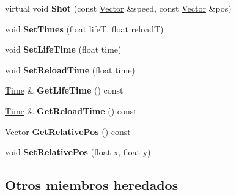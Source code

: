 \begin{DoxyCompactItemize}
\item 
\hypertarget{classGun_a06d33bb4fc2d7937b05dd76caa7f3636}{virtual void {\bfseries Shot} (const \hyperlink{classVector}{Vector} \&speed, const \hyperlink{classVector}{Vector} \&pos)}\label{classGun_a06d33bb4fc2d7937b05dd76caa7f3636}

\item 
\hypertarget{classGun_a5d821a89ad458d1edd25fbf62d3f05fd}{void {\bfseries Set\-Times} (float life\-T, float reload\-T)}\label{classGun_a5d821a89ad458d1edd25fbf62d3f05fd}

\item 
\hypertarget{classGun_a4d7569f0a79398fd13cebf02ed859c06}{void {\bfseries Set\-Life\-Time} (float time)}\label{classGun_a4d7569f0a79398fd13cebf02ed859c06}

\item 
\hypertarget{classGun_ab3d0e69a52be0f11a38198d8a1d88536}{void {\bfseries Set\-Reload\-Time} (float time)}\label{classGun_ab3d0e69a52be0f11a38198d8a1d88536}

\item 
\hypertarget{classGun_a03bd2ed00d1fdb1767b78b0bec26ef05}{\hyperlink{classTime}{Time} \& {\bfseries Get\-Life\-Time} () const }\label{classGun_a03bd2ed00d1fdb1767b78b0bec26ef05}

\item 
\hypertarget{classGun_ad95a0db1e8df971a1eacefbff01f1b2c}{\hyperlink{classTime}{Time} \& {\bfseries Get\-Reload\-Time} () const }\label{classGun_ad95a0db1e8df971a1eacefbff01f1b2c}

\item 
\hypertarget{classGun_a033e18eb676db223a31a8c3a0371360e}{\hyperlink{classVector}{Vector} {\bfseries Get\-Relative\-Pos} () const }\label{classGun_a033e18eb676db223a31a8c3a0371360e}

\item 
\hypertarget{classGun_acd491acca640ffde2b1232ea381d1f77}{void {\bfseries Set\-Relative\-Pos} (float x, float y)}\label{classGun_acd491acca640ffde2b1232ea381d1f77}

\end{DoxyCompactItemize}
\subsection*{Otros miembros heredados}


